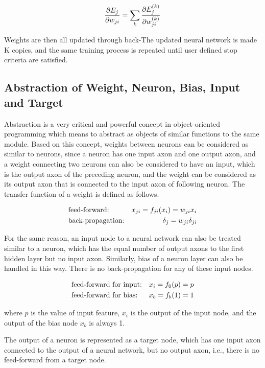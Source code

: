 \documentclass[procedia]{easychair}
\begin{document}
\begin{equation}
    \frac{\partial E_j}{\partial w_{ji}} = \sum_k \frac{\partial E_j^{(k)}}{\partial w_{ji}^{(k)}} \notag
\end{equation}

Weights are then all updated through back-The updated neural network is made K copies, and the same training process is repeated until user defined stop criteria are satisfied.

\subsection{Abstraction of Weight, Neuron, Bias, Input and Target}

Abstraction is a very critical and powerful concept in object-oriented programming which means to abstract as objects of similar functions to the same module.  Based on this concept, weights between neurons can be considered as similar to neurons, since a neuron has one input axon and one output axon, and a weight connecting two neurons can also be considered to have an input, which is the output axon of the preceding neuron, and the weight can be considered as its output axon that is connected to the input axon of following neuron.  The transfer function of a weight is defined as follows.

\begin{align}
    & \text{feed-forward:} & x_{ji} = f_{ji}(x_i) = w_{ji}x_i \notag \\
    & \text{back-propagation:} & \delta_j = w_{ji}\delta_{ji} \notag
\end{align}

For the same reason, an input node to a neural network can also be treated similar to a neuron, which has the equal number of output axons to the first hidden layer but no input axon.  Similarly, bias of a neuron layer can also be handled in this way.  There is no back-propagation for any of these input nodes.

\begin{align}
	& \text{feed-forward for input:} & x_i = f_0(p) = p \notag \\
	& \text{feed-forward for bias:} & x_b = f_b(1) = 1 \notag
\end{align}

where $p$ is the value of input feature, $x_i$ is the output of the input node, and the output of the bias node $x_b$ is always 1.

The output of a neuron is represented as a target node, which has one input axon connected to the output of a neural network, but no output axon, i.e., there is no feed-forward from a target node.
\end{document}
